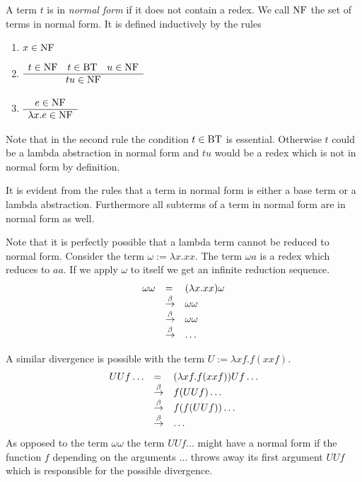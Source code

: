 \documentclass[12pt]{article}
\begin{document}
\begin{definition}
    A term $t$ is in
    \emph{normal form}
    if it does not contain a redex. We call $\text{NF}$ the set of terms in normal
    form. It is defined inductively by the rules
    \begin{enumerate}
        \item $x \in \text{NF}$

        \item $
            \begin{array}{c} t \in \text{NF} \quad t \in \text{BT} \quad u \in \text{NF} \\ \hline t u \in \text{NF} \end{array}
            $

        \item
            $\begin{array}{c} e \in \text{NF} \\ \hline \lambda x. e \in \text{NF} \end{array}$
    \end{enumerate}
    Note that in the second rule the condition $t \in \text{BT}$ is essential.
    Otherwise $t$ could be a lambda abstraction in normal form and $t u$ would
    be a redex which is not in normal form by definition.

    It is evident from the rules that a term in normal form is either a base
    term or a lambda abstraction. Furthermore all subterms of a term in normal
    form are in normal form as well.
\end{definition}

Note that it is perfectly possible that a lambda term cannot be reduced to
normal form. Consider the term $\omega := \lambda x . x x$. The term $\omega a$
is a redex which reduces to $a a$. If we apply $\omega$ to itself we get an
infinite reduction sequence.
$$
\begin{array}{lllll} 
    \omega \omega
    &=& (\lambda x . x x) \omega
    \\
    &\stackrel{\beta}\to& \omega \omega
    \\
    &\stackrel{\beta}\to& \omega \omega
    \\
    &\stackrel{\beta}\to& \ldots
 \end{array}
$$

A similar divergence is possible with the term $U := \lambda x f. f (x x f)$.
$$
\begin{array}{lllll} 
    U U f \ldots
    &=& (\lambda x f. f (x x f)) U f \ldots
    \\
    &\stackrel{\beta}\to& f (U U f) \ldots
    \\
    &\stackrel{\beta}\to& f (f (U U f)) \ldots
    \\
    &\stackrel{\beta}\to& \ldots
 \end{array}
$$
As opposed to the term $\omega \omega$ the term $U U f \ldots$ might have a
normal form if the function $f$ depending on the arguments $\ldots$ throws away
its first argument $U U f$ which is responsible for the possible divergence.
\end{document}
